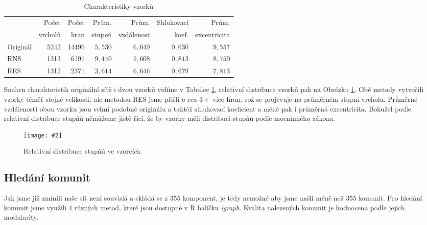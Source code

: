 \documentclass[a4paper,12pt]{article}
\newcommand{\image}[4]{\begin{figure}[h!] \centering \texttt{[image: \#2]} \caption{#4} \label{#3} \end{figure}}
\begin{document}
\begin{table}[h!]
    \centering
    \begin{tabular}{l | r | r | r | r | r | r}
                                & Počet     & Počet & Prům.     & Prům.         & Shlukovací    & Prům. \\
                                & vrcholů   & hran  & stupeň    & vzdálenost    & koef.         & excentricita \\\hline\hline
        Originál            & 5242          & 14496 & $5,530$   & $6,049$       & $0,630$       & $9,557$       \\
        RNS                 & 1313          & 6197  & $9,440$   & $5,608$       & $0,813$       & $8,750$       \\
        RES                 & 1312          & 2371  & $3,614$   & $6,646$       & $0,679$       & $7,813$       \\
    \end{tabular}
    \caption{Charakteristiky vzorků}
    \label{tab:sampleChars}
\end{table}

Souhrn charakteristik originální síťě i dvou vzorků vidíme v Tabulce \ref{tab:sampleChars}, relativní distribuce vzorků pak na Obrázku \ref{fig:sampleDD}.
Obě metody vytvořili vzorky téměř stejné velikosti, ale metodou RES jsme přišli o cca $3 \times$ více hran, což se projevuje na průměrném stupni vrcholu. 
Průměrné vzdálenosti obou vzorku jsou velmi podobné originálu a taktéž shlukovací koeficient a méně pak i průměrná excentricita. Bohužel podle relativní
distribuce stupňů němůžeme jistě řící, že by vzorky měli distribuci stupňů podle mocninného zákona.

\image{0.7}{../grafy/sampleDD.pdf}{fig:sampleDD}{Relativní distribuce stupňů ve vzorcích}
\FloatBarrier
\newpage

\subsection{Hledání komunit}
Jak jsme již zmínili naše síť není souvislá a skládá se z 355 komponent, je tedy nemožné aby jsme našli méně než 355 komunit.
Pro hledání komunit jsme využili 4 různých metod, které jsou dostupné v R balíčku \emph{igraph}. Kvalita nalezených komunit je hodnocena podle jejich 
modularity.
\end{document}
